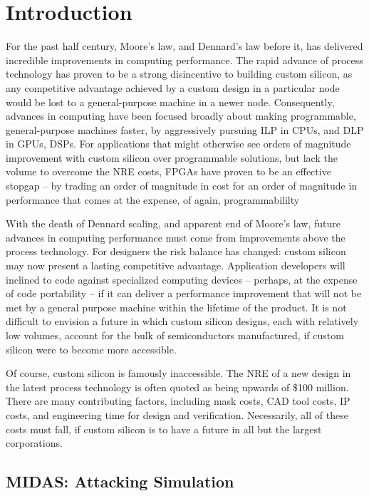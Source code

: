 \chapter{Introduction}

For the past half century, Moore's law, and Dennard's law before it, has
delivered incredible improvements in computing performance. The rapid advance
of process technology has proven to be a strong disincentive to building custom
silicon, as any competitive advantage achieved by a
custom design in a particular node would be lost to a general-purpose
machine in a newer node. Consequently, advances in computing have
been focused broadly about making programmable, general-purpose machines
faster, by aggressively pursuing ILP in CPUs, and DLP in GPUs, DSPs. For
applications that might otherwise see orders of magnitude improvement with
custom silicon over programmable solutions, but lack the volume to overcome the
NRE costs, FPGAs have proven to be an effective stopgap -- by trading an order of
magnitude in cost for an order of magnitude in performance that comes at the
expense, of again, programmabililty

With the death of Dennard scaling, and apparent end of Moore’s law, future
advances in computing performance must come from improvements above the process
technology.  For designers the risk balance has changed: custom silicon may now
present a lasting competitive advantage. Application developers will inclined
to code against specialized computing devices -- perhaps, at the expense of
code portability -- if it can deliver a performance improvement that will not
be met by a general purpose machine within the lifetime of the product. It is
not difficult to envision a future in which custom silicon designs, each with
relatively low volumes, account for the bulk of semiconductors manufactured, if
custom silicon were to become more accessible.


Of course, custom silicon is famously inaccessible. The NRE of a new design in
the latest process technology is often quoted as being upwards of \$100
million.  There are many contributing factors, including mask
costs, CAD tool costs, IP costs, and engineering time for design and
verification. Necessarily, all of these costs must fall, if custom silicon is
to have a future in all but the largest corporations.

\section{MIDAS: Attacking Simulation}

